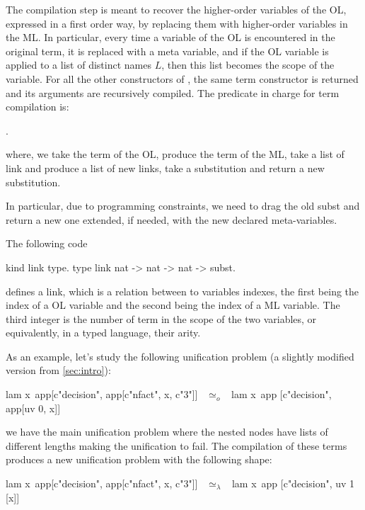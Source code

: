 \documentclass[sigconf,natbib=false]{acmart}
\newcommand{\UnifRel}{\ensuremath{\simeq}}
\newcommand{\Uo}{\ensuremath{\UnifRel_o}\xspace}
\newcommand{\Ue}{\ensuremath{\UnifRel_\lambda}\xspace}
\begin{document}
The compilation step is meant to recover the higher-order variables of the OL,
expressed in a first order way, by replacing them with higher-order variables in
the ML. In particular, every time a variable of the OL is encountered in the
original term, it is replaced with a meta variable, and if the OL variable is
applied to a list of distinct names $L$, then this list becomes the scope of the variable. 
For all the other constructors of
, the same term constructor is returned and its arguments are
recursively compiled. The predicate in charge for term compilation is:

. 

\noindent
where, we take the term of the OL, produce the term of the ML, take a list
of link and produce a list of new links, take a substitution and return a 
new substitution.

In particular, due to programming constraints, we need to drag the old subst and
return a new one extended, if needed, with the new declared meta-variables.

The following code
%
\begin{elpicode}
  kind link type.
  type link nat -> nat -> nat -> subst.
\end{elpicode}
%
\noindent
defines a link, which is a relation between to variables indexes, the first
being the index of a OL variable and the second being the index of a ML
variable. The third integer is the number of term in the
scope of the two variables, or equivalently, in a typed language, their arity. 

As an example, let's study the following unification problem (a slightly 
modified version from \cref{sec:intro}):

\begin{elpicode}
  lam x\ app[c"decision", app[c"nfact", x, c"3"]] ~\Uo~
    lam x\ app [c"decision", app[uv 0, x]]
\end{elpicode}

\noindent
we have the main unification problem where the nested  nodes have
lists of different lengths making the unification to fail. The compilation of 
these terms produces a new unification problem with the following shape:

\begin{elpicode}
  lam x\ app[c"decision", app[c"nfact", x, c"3"]] ~\Ue~
    lam x\ app [c"decision", uv 1 [x]]
\end{elpicode}
\end{document}
